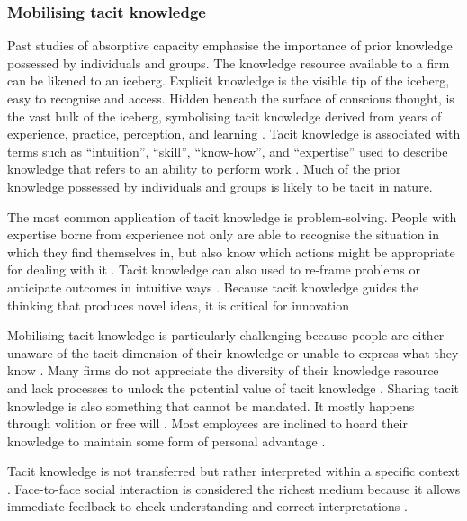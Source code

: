 \subsubsection{Mobilising tacit knowledge}

Past studies of absorptive capacity emphasise the importance of prior knowledge possessed by individuals and groups. The knowledge resource available to a firm can be likened to an iceberg. Explicit knowledge is the visible tip of the iceberg, easy to recognise and access. Hidden beneath the surface of conscious thought, is the vast bulk of the iceberg, symbolising tacit knowledge derived from years of experience, practice, perception, and learning \citep{spender1996making,haldin2000difficulties,mcadam2007exploring,rebernik2007fostering}. Tacit knowledge is associated with terms such as \enquote{intuition}, \enquote{skill}, \enquote{know-how}, and \enquote{expertise} used to describe knowledge that refers to an ability to perform work \citep{horvath2000working,mcadam2007exploring}. Much of the prior knowledge possessed by individuals and groups is likely to be tacit in nature. \medskip

The most common application of tacit knowledge is problem-solving. People with expertise borne from experience not only are able to recognise the situation in which they find themselves in, but also know which actions might be appropriate for dealing with it \citep{simon1971human,leonard1998role}. Tacit knowledge can also used to re-frame problems or anticipate outcomes in intuitive ways \citep{leonard1998role}. Because tacit knowledge guides the thinking that produces novel ideas, it is critical for innovation \citep{leonard1998role,amar2008descriptive}. \medskip

Mobilising tacit knowledge is particularly challenging because people are either unaware of the tacit dimension of their knowledge or unable to express what they know \citep{polanyi1966tacit,leonard1998role}. Many firms do not appreciate the diversity of their knowledge resource and lack processes to unlock the potential value of tacit knowledge \citep{nonaka1994dynamic,horvath2000working}. Sharing tacit knowledge is also something that cannot be mandated. It mostly happens through volition or free will \citep{polanyi1966tacit}. Most employees are inclined to hoard their knowledge to maintain some form of personal advantage \citep{eraut2000non,riege2005three,milne2007motivation}.  \medskip

Tacit knowledge is not transferred but rather interpreted within a specific context \citep{nonaka1995knowledge,duguid2005art,marabelli2014knowing}. Face-to-face social interaction is considered the richest medium because it allows immediate feedback to check understanding and correct interpretations \citep{koskinen2003tacit}. \medskip

